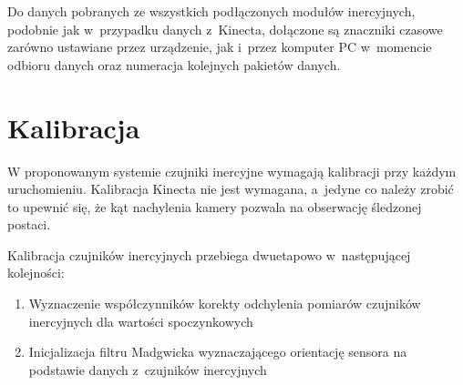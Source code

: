 Do danych pobranych ze wszystkich podłączonych modułów inercyjnych, podobnie jak w~przypadku danych z~Kinecta, dołączone są znaczniki czasowe zarówno ustawiane przez urządzenie, jak i~przez komputer PC w~momencie odbioru danych oraz numeracja kolejnych pakietów danych.

\section{Kalibracja}
W proponowanym systemie czujniki inercyjne wymagają kalibracji przy każdym uruchomieniu. Kalibracja Kinecta nie jest wymagana, a~jedyne co należy zrobić to upewnić się, że kąt nachylenia kamery pozwala na obserwację śledzonej postaci.

Kalibracja czujników inercyjnych przebiega dwuetapowo w~następującej kolejności:
\begin{enumerate}
	\item {Wyznaczenie współczynników korekty odchylenia pomiarów czujników inercyjnych dla wartości spoczynkowych} 
	\item {Inicjalizacja filtru Madgwicka wyznaczającego orientację sensora na podstawie danych z~czujników inercyjnych}
\end{enumerate}

